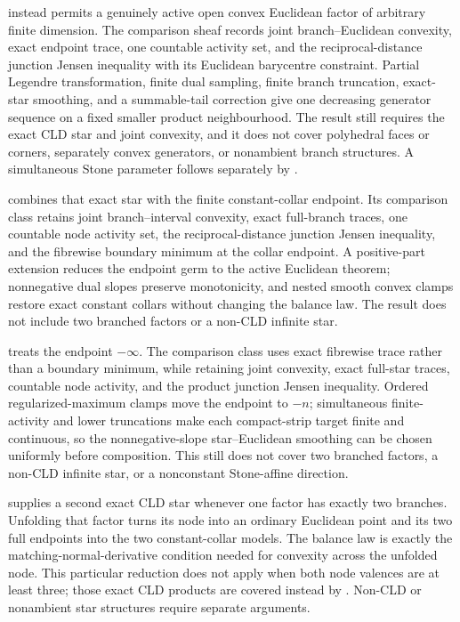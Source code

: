 \begin{remark}
 instead permits a genuinely
active open convex Euclidean factor of arbitrary finite dimension.  The
comparison sheaf records joint branch--Euclidean convexity, exact endpoint
trace, one countable activity set, and the reciprocal-distance junction
Jensen inequality with its Euclidean barycentre constraint.  Partial
Legendre transformation, finite dual sampling, finite branch truncation,
exact-star smoothing, and a summable-tail correction give one decreasing
generator sequence on a fixed smaller product neighbourhood.  The result
still requires the exact CLD star and joint convexity, and it does not cover
polyhedral faces or corners, separately convex generators, or nonambient
branch structures.  A simultaneous Stone parameter follows separately by
.

 combines that
exact star with the finite constant-collar endpoint.  Its comparison class
retains joint branch--interval convexity, exact full-branch traces, one
countable node activity set, the reciprocal-distance junction Jensen
inequality, and the fibrewise boundary minimum at the collar endpoint.  A
positive-part extension reduces the endpoint germ to the active Euclidean
theorem; nonnegative dual slopes preserve monotonicity, and nested smooth
convex clamps restore exact constant collars without changing the balance
law.  The result does not include two branched factors or a non-CLD infinite
star.

 treats the
endpoint $-\infty$.  The comparison class uses exact fibrewise trace rather
than a boundary minimum, while retaining joint convexity, exact full-star
traces, countable node activity, and the product junction Jensen inequality.
Ordered regularized-maximum clamps move the endpoint to $-n$; simultaneous
finite-activity and lower truncations make each compact-strip target finite
and continuous, so the nonnegative-slope star--Euclidean smoothing can be
chosen uniformly before composition.  This still does not cover two
branched factors, a non-CLD infinite star, or a nonconstant Stone-affine
direction.

 supplies a second exact CLD
star whenever one factor has exactly two branches.  Unfolding that factor
turns its node into an ordinary Euclidean point and its two full endpoints
into the two constant-collar models.  The balance law is exactly the
matching-normal-derivative condition needed for convexity across the
unfolded node.  This particular reduction does not apply when both node
valences are at least three; those exact CLD products are covered instead by
.  Non-CLD or nonambient
star structures require separate arguments.


\end{remark}
